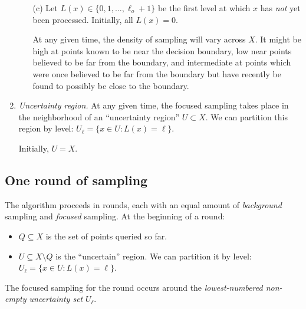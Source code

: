 \documentclass{article}
\begin{document}
\begin{enumerate}
\begin{enumerate}
\item[(c)] Let $L(x) \in \{0,1,\ldots,\ell_o+1\}$ be the first level at which $x$ has {\it not} yet been processed. Initially, all $L(x) = 0$.

At any given time, the density of sampling will vary across $X$. It might be high at points known to be near the decision boundary, low near points believed to be far from the boundary, and intermediate at points which were once believed to be far from the boundary but have recently be found to possibly be close to the boundary.

\end{enumerate}

\item {\it Uncertainty region.} At any given time, the focused sampling takes place in the neighborhood of an ``uncertainty region'' $U \subset X$. We can partition this region by level: $U_\ell = \{x \in U: L(x) = \ell\}$.

Initially, $U = X$.

\end{enumerate}


\subsection{One round of sampling}

The algorithm proceeds in rounds, each with an equal amount of {\it background} sampling and {\it focused} sampling. At the beginning of a round:
\begin{itemize}
\item $Q \subseteq X$ is the set of points queried so far. 

\item $U \subseteq X \setminus Q$ is the ``uncertain'' region. We can partition it by level: $U_\ell = \{x \in U: L(x) = \ell\}$.
\end{itemize}
The focused sampling for the round occurs around the {\it lowest-numbered non-empty uncertainty set} $U_\ell$.
\end{document}
